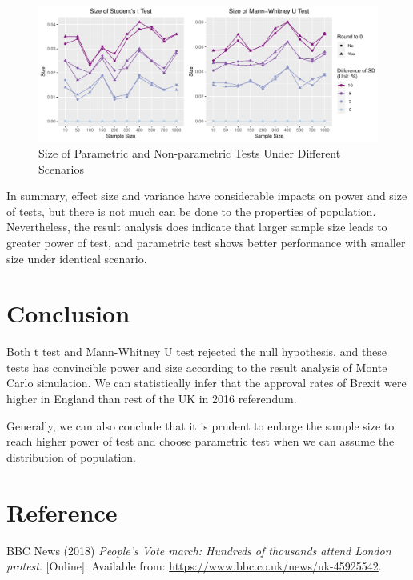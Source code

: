 \documentclass[]{article}
\begin{document}
\begin{figure}
\centering
\includegraphics{../figure/size.pdf}
\caption{Size of Parametric and Non-parametric Tests Under Different
Scenarios}
\end{figure}

In summary, effect size and variance have considerable impacts on power
and size of tests, but there is not much can be done to the properties
of population. Nevertheless, the result analysis does indicate that
larger sample size leads to greater power of test, and parametric test
shows better performance with smaller size under identical scenario.

\hypertarget{conclusion}{%
\section{Conclusion}\label{conclusion}}

Both t test and Mann-Whitney U test rejected the null hypothesis, and
these tests has convincible power and size according to the result
analysis of Monte Carlo simulation. We can statistically infer that the
approval rates of Brexit were higher in England than rest of the UK in
2016 referendum.

Generally, we can also conclude that it is prudent to enlarge the sample
size to reach higher power of test and choose parametric test when we
can assume the distribution of population.

\newpage

\hypertarget{reference}{%
\section{Reference}\label{reference}}

\hypertarget{refs}{}
\leavevmode\hypertarget{ref-BBCNews2018}{}%
BBC News (2018) \emph{People's Vote march: Hundreds of thousands attend
London protest}. {[}Online{]}. Available from:
\url{https://www.bbc.co.uk/news/uk-45925542}.
\end{document}
